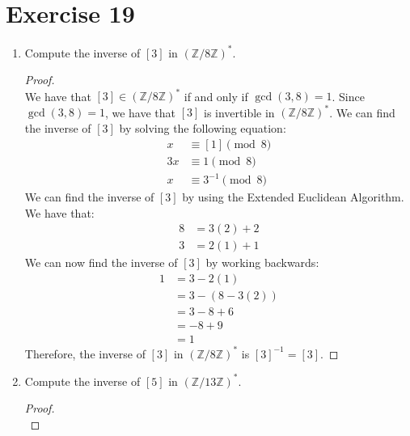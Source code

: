 \documentclass{article}
\begin{document}

\newpage

\section*{Exercise 19} 
\begin{enumerate}
    \item Compute the inverse of $[3]$ in $(\mathbb{Z}/8\mathbb{Z})^*$.
    \begin{proof}
        \leavevmode \\ 
        We have that $[3] \in (\mathbb{Z}/8\mathbb{Z})^*$ if and only if $\gcd(3, 8) = 1$. Since $\gcd(3, 8) = 1$, we have that $[3]$ is invertible in $(\mathbb{Z}/8\mathbb{Z})^*$. We can find the inverse of $[3]$ by solving the following equation:
        \begin{align*}
            [3]x &\equiv [1] \pmod{8} \\
            3x &\equiv 1 \pmod{8} \\
            x &\equiv 3^{-1} \pmod{8}
        \end{align*}
        We can find the inverse of $[3]$ by using the Extended Euclidean Algorithm. We have that:
        \begin{align*}
            8 &= 3(2) + 2 \\
            3 &= 2(1) + 1
        \end{align*}
        We can now find the inverse of $[3]$ by working backwards:
        \begin{align*}
            1 &= 3 - 2(1) \\
            &= 3 - (8 - 3(2)) \\
            &= 3 - 8 + 6 \\
            &= -8 + 9 \\
            &= 1
        \end{align*}
        Therefore, the inverse of $[3]$ in $(\mathbb{Z}/8\mathbb{Z})^*$ is $[3]^{-1} = [3]$.
    \end{proof}
    \item Compute the inverse of $[5]$ in $(\mathbb{Z}/13\mathbb{Z})^*$.
    \begin{proof}
         \leavevmode \\ 
        

\end{proof}
\end{enumerate}
\end{document}
